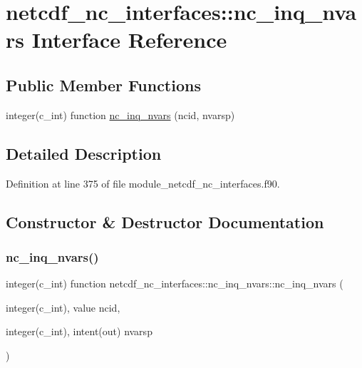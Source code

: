 \hypertarget{interfacenetcdf__nc__interfaces_1_1nc__inq__nvars}{}\section{netcdf\+\_\+nc\+\_\+interfaces\+:\+:nc\+\_\+inq\+\_\+nvars Interface Reference}
\label{interfacenetcdf__nc__interfaces_1_1nc__inq__nvars}
\subsection*{Public Member Functions}
\begin{DoxyCompactItemize}
\item 
integer(c\+\_\+int) function \hyperlink{interfacenetcdf__nc__interfaces_1_1nc__inq__nvars_a2ff8c1623dacd6e26ab6c79a0851803e}{nc\+\_\+inq\+\_\+nvars} (ncid, nvarsp)
\end{DoxyCompactItemize}


\subsection{Detailed Description}


Definition at line 375 of file module\+\_\+netcdf\+\_\+nc\+\_\+interfaces.\+f90.



\subsection{Constructor \& Destructor Documentation}
\mbox{\label{interfacenetcdf__nc__interfaces_1_1nc__inq__nvars_a2ff8c1623dacd6e26ab6c79a0851803e}} 
\subsubsection{\texorpdfstring{nc\+\_\+inq\+\_\+nvars()}{nc\_inq\_nvars()}}
{\footnotesize\ttfamily integer(c\+\_\+int) function netcdf\+\_\+nc\+\_\+interfaces\+::nc\+\_\+inq\+\_\+nvars\+::nc\+\_\+inq\+\_\+nvars (\begin{DoxyParamCaption}\item[{integer(c\+\_\+int), value}]{ncid,  }\item[{integer(c\+\_\+int), intent(out)}]{nvarsp }\end{DoxyParamCaption})}



